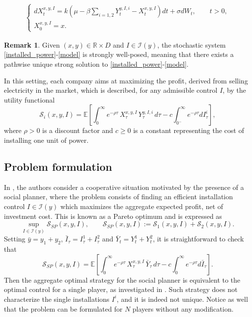 \documentclass[10pt]{article}
\numberwithin{equation}{section}
\theoremstyle{plain}
\numberwithin{theorem}{section}
\theoremstyle{definition}
\newtheorem{remark}[theorem]{Remark}
\def \b {{\beta}}
\def \R {\mathbb{R}}
\def \t {\tau}
\newcommand{\<}{\langle}
\renewcommand{\>}{\rangle}
\renewcommand{\(}{\left(}
\renewcommand{\)}{\right)}
\def \R  {{\mathbb {R}}}
\def \t {{\tau}}
\def \b {{\beta}}
\def \R {{\mathbb {R}}}
\def \t {{\tau}}
\def \t {{\tau}}
\def\cI{{\mathcal I}}
\def\cS{{\mathcal S}}
\begin{document}
{\begin{align}
\begin{cases}
dX^{x,y,I}_t=k\left(\mu-\b \sum_{i=1,2}Y_{t}^{y,I,i}-X^{x,y,I}_t\right)dt+\sigma dW_t, \qquad t>0,\\
X^{x,y,I}_0=x.
\end{cases}
\end{align}
{
\begin{remark}\label{eq:sde_well_posed}
Given $(x,y)\in \R \times D$ and $I\in \cI (y)$, the stochastic system \eqref{installed_power}-\eqref{model} is strongly well-posed, meaning that there exists a pathwise unique strong solution to \eqref{installed_power}-\eqref{model}.
\end{remark}
}
In this setting, each company aims at maximizing the profit, derived from selling electricity in the market, which is described, for any admissible control $I$, by the %
utility functional 
\begin{equation}\label{cost}
\cS_i(x,y,I)=\mathbb{E}\left[\int_{0}^{\infty}e^{-\rho\t}\,X^{x,y,I}_{\tau}\, Y^{y,I,i}_{\tau}\, d\t-c\int_{{0^-}}^{\infty}e^{-\rho\t}dI^i_{\tau}\right],
\end{equation}
where {$\rho>0$} is a discount factor and $c\ge 0$ is a constant representing the cost of installing one unit of power. 

\subsection{Problem formulation}

In \cite{MR4352705}, the authors consider {a cooperative situation motivated by the presence of a social planner}, where the problem consists of finding an efficient installation control ${I\in \cI (y)}$ which maximizes the 
aggregate expected profit, net of investment cost. This is known as a Pareto optimum and is expressed as
$$\sup_{{I\in  \cI (y)}}\cS_{SP}(x,y,I),\qquad  \cS_{SP}(x,y,I):=\cS_1(x,y,I)+\cS_2(x,y,I).$$
 Setting $\bar{y}=y_1+y_2$, $\bar{I}_{\tau}=I^1_{\tau}+I^2_{\tau}$ {and $\bar{Y}_t=Y^1_t+Y^2_t$}, it is straightforward to check that 
\begin{equation}
\cS_{SP}(x,y,I)=\mathbb{E}\left[\int_{0}^{\infty}e^{-\rho\t}\,X^{x,y,I}_{\tau}\, {\bar{Y}_{\tau}}\, d\t-c\int_{0}^{\infty}e^{-\rho\t}d\bar{I}_{\tau}\right].
\end{equation}
Then the aggregate optimal strategy for the social planner is equivalent to the optimal control for a single player, as investigated in \cite{MR4305783}. Such strategy does not characterize the single installations $I^i$, and it is indeed not unique. Notice as well that the problem can be formulated for $N$ players without any  modification. 

}
\end{document}
